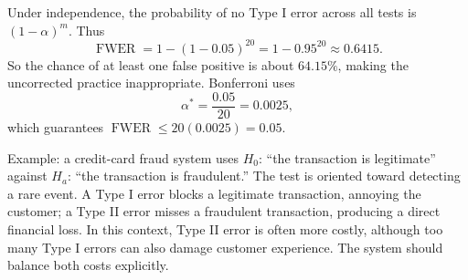 \begin{solproblema}[prob:66368eb]
Under independence, the probability of no Type I error across all tests is $(1-\alpha)^m$. Thus
\[
	\operatorname{FWER}=1-(1-0.05)^{20}=1-0.95^{20}\approx0.6415.
\]
So the chance of at least one false positive is about $64.15\%$, making the uncorrected practice inappropriate. Bonferroni uses
\[
	\alpha^*=\frac{0.05}{20}=0.0025,
\]
which guarantees $\operatorname{FWER}\le20(0.0025)=0.05$.
\end{solproblema}

\begin{solproblema}[prob:d04b6da]
Example: a credit-card fraud system uses $H_0$: ``the transaction is legitimate'' against $H_a$: ``the transaction is fraudulent.'' The test is oriented toward detecting a rare event. A Type I error blocks a legitimate transaction, annoying the customer; a Type II error misses a fraudulent transaction, producing a direct financial loss. In this context, Type II error is often more costly, although too many Type I errors can also damage customer experience. The system should balance both costs explicitly.
\end{solproblema}

